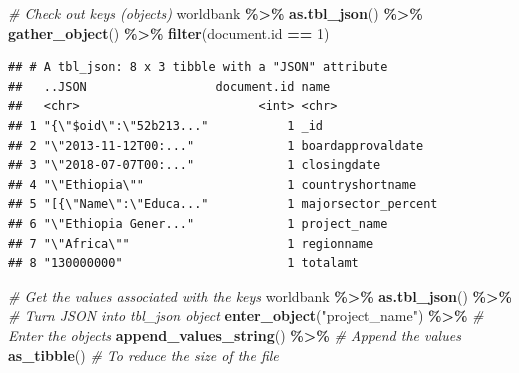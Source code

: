 \documentclass[
]{book}
\newenvironment{Shaded}{\begin{snugshade}}{\end{snugshade}}
\newcommand{\CommentTok}[1]{\textcolor[rgb]{0.56,0.35,0.01}{\textit{#1}}}
\newcommand{\DecValTok}[1]{\textcolor[rgb]{0.00,0.00,0.81}{#1}}
\newcommand{\FunctionTok}[1]{\textcolor[rgb]{0.13,0.29,0.53}{\textbf{#1}}}
\newcommand{\NormalTok}[1]{#1}
\newcommand{\SpecialCharTok}[1]{\textcolor[rgb]{0.81,0.36,0.00}{\textbf{#1}}}
\newcommand{\StringTok}[1]{\textcolor[rgb]{0.31,0.60,0.02}{#1}}
\begin{document}
\begin{Shaded}
\begin{Highlighting}[]
\CommentTok{\# Check out keys (objects)}
\NormalTok{worldbank }\SpecialCharTok{\%\textgreater{}\%} 
  \FunctionTok{as.tbl\_json}\NormalTok{() }\SpecialCharTok{\%\textgreater{}\%}
  \FunctionTok{gather\_object}\NormalTok{() }\SpecialCharTok{\%\textgreater{}\%}
  \FunctionTok{filter}\NormalTok{(document.id }\SpecialCharTok{==} \DecValTok{1}\NormalTok{)}
\end{Highlighting}
\end{Shaded}

\begin{verbatim}
## # A tbl_json: 8 x 3 tibble with a "JSON" attribute
##   ..JSON                  document.id name               
##   <chr>                         <int> <chr>              
## 1 "{\"$oid\":\"52b213..."           1 _id                
## 2 "\"2013-11-12T00:..."             1 boardapprovaldate  
## 3 "\"2018-07-07T00:..."             1 closingdate        
## 4 "\"Ethiopia\""                    1 countryshortname   
## 5 "[{\"Name\":\"Educa..."           1 majorsector_percent
## 6 "\"Ethiopia Gener..."             1 project_name       
## 7 "\"Africa\""                      1 regionname         
## 8 "130000000"                       1 totalamt
\end{verbatim}

\begin{Shaded}
\begin{Highlighting}[]
\CommentTok{\# Get the values associated with the keys }
\NormalTok{worldbank }\SpecialCharTok{\%\textgreater{}\%} 
  \FunctionTok{as.tbl\_json}\NormalTok{() }\SpecialCharTok{\%\textgreater{}\%} \CommentTok{\# Turn JSON into tbl\_json object }
  \FunctionTok{enter\_object}\NormalTok{(}\StringTok{"project\_name"}\NormalTok{) }\SpecialCharTok{\%\textgreater{}\%} \CommentTok{\# Enter the objects }
  \FunctionTok{append\_values\_string}\NormalTok{() }\SpecialCharTok{\%\textgreater{}\%} \CommentTok{\# Append the values }
  \FunctionTok{as\_tibble}\NormalTok{() }\CommentTok{\# To reduce the size of the file }
\end{Highlighting}
\end{Shaded}
\end{document}
